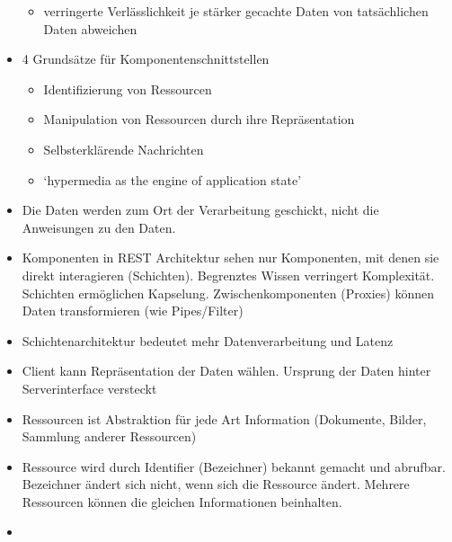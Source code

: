\begin{itemize}
\begin{itemize}
    \item verringerte Verlässlichkeit je stärker gecachte Daten von tatsächlichen Daten abweichen
  \end{itemize}
  \item 4 Grundsätze für Komponentenschnittstellen
  \begin{itemize}
    \item Identifizierung von Ressourcen
    \item Manipulation von Ressourcen durch ihre Repräsentation
    \item Selbsterklärende Nachrichten
    \item `hypermedia as the engine of application state'
  \end{itemize}
  \item Die Daten werden zum Ort der Verarbeitung geschickt, nicht die Anweisungen zu den Daten.
  \item Komponenten in REST Architektur sehen nur Komponenten, mit denen sie direkt interagieren (Schichten). Begrenztes Wissen verringert Komplexität. Schichten ermöglichen Kapselung. Zwischenkomponenten (Proxies) können Daten transformieren (wie Pipes/Filter)
  \item Schichtenarchitektur bedeutet mehr Datenverarbeitung und Latenz
  \item Client kann Repräsentation der Daten wählen. Ursprung der Daten hinter Serverinterface versteckt
  \item Ressourcen ist Abstraktion für jede Art Information (Dokumente, Bilder, Sammlung anderer Ressourcen)
  \item Ressource wird durch Identifier (Bezeichner) bekannt gemacht und abrufbar. Bezeichner ändert sich nicht, wenn sich die Ressource ändert. Mehrere Ressourcen können die gleichen Informationen beinhalten.
  \item 
\end{itemize}